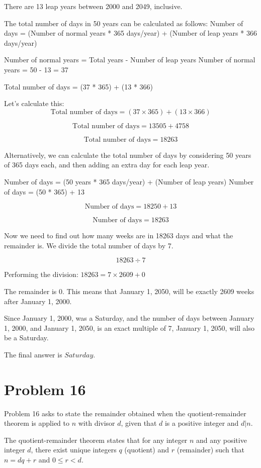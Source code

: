 \documentclass{article}
\begin{document}
There are 13 leap years between 2000 and 2049, inclusive.

The total number of days in 50 years can be calculated as follows:
Number of days = (Number of normal years * 365 days/year) + (Number of leap years * 366 days/year)

Number of normal years = Total years - Number of leap years
Number of normal years = 50 - 13 = 37

Total number of days = (37 * 365) + (13 * 366)

Let's calculate this:
$$
\text{Total number of days} = (37 \times 365) + (13 \times 366)
$$

$$
\text{Total number of days} = 13505 + 4758
$$

$$
\text{Total number of days} = 18263
$$

Alternatively, we can calculate the total number of days by considering 50 years of 365 days each, and then adding an extra day for each leap year.

Number of days = (50 years * 365 days/year) + (Number of leap years)
Number of days = (50 * 365) + 13

$$
\text{Number of days} = 18250 + 13
$$

$$
\text{Number of days} = 18263
$$

Now we need to find out how many weeks are in 18263 days and what the remainder is. We divide the total number of days by 7.

$$
18263 \div 7
$$

Performing the division:
$18263 = 7 \times 2609 + 0$

The remainder is 0. This means that January 1, 2050, will be exactly 2609 weeks after January 1, 2000.

Since January 1, 2000, was a Saturday, and the number of days between January 1, 2000, and January 1, 2050, is an exact multiple of 7, January 1, 2050, will also be a Saturday.

The final answer is $\boxed{Saturday}$.

\newpage

\section*{Problem 16}
Problem 16 asks to state the remainder obtained when the quotient-remainder theorem is applied to $n$ with divisor $d$, given that $d$ is a positive integer and $d|n$.

The quotient-remainder theorem states that for any integer $n$ and any positive integer $d$, there exist unique integers $q$ (quotient) and $r$ (remainder) such that $n = dq + r$ and $0 \le r < d$.
\end{document}
